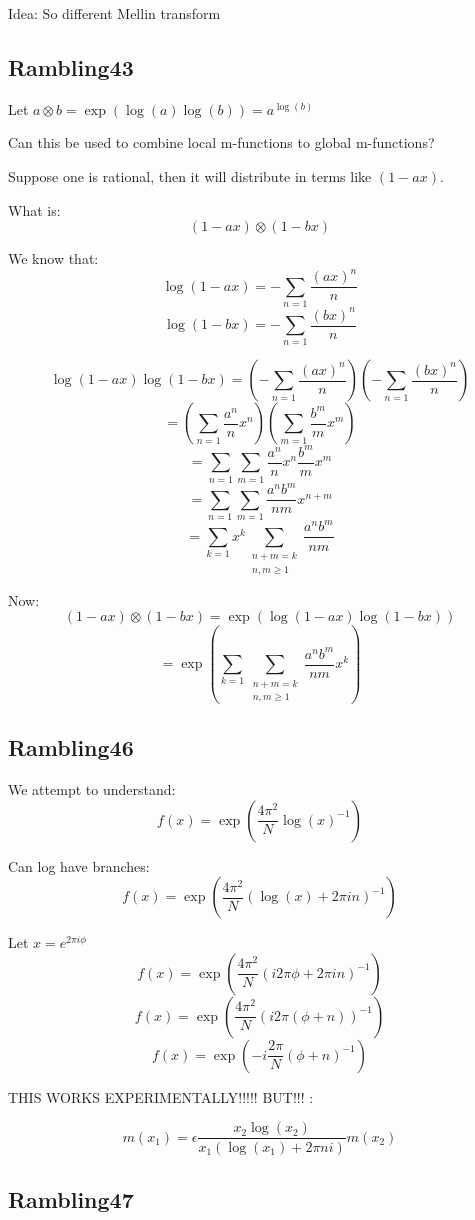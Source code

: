 \documentclass[a4paper]{amsart}
\begin{document}
Idea: So different Mellin transform


\subsection{Rambling43}


Let $a \otimes b = \exp(\log(a)\log(b)) = a^{\log(b)}$

Can this be used to combine local m-functions to global m-functions?

Suppose one is rational, then it will distribute in terms like $(1 - ax)$.

What is: 
$$(1 - ax) \otimes (1 - bx)$$

We know that:
$$\log(1 - ax) = - \sum_{n = 1} \frac{(ax)^n}{n}$$
$$\log(1 - bx) = - \sum_{n = 1} \frac{(bx)^n}{n}$$

$$\log(1 - ax)\log(1 - bx) = (- \sum_{n = 1} \frac{(ax)^n}{n})(- \sum_{n = 1} \frac{(bx)^n}{n})$$
$$ = (\sum_{n = 1} \frac{a^n}{n}x^n)(\sum_{m = 1} \frac{b^m}{m}x^m)$$
$$ = \sum_{n = 1} \sum_{m = 1} \frac{a^n}{n}x^n \frac{b^m}{m}x^m$$
$$ = \sum_{n = 1} \sum_{m = 1} \frac{a^nb^m}{nm} x^{n + m}$$
$$ = \sum_{k = 1} x^k \sum_{\substack{n + m = k \\ n, m \ge 1}} \frac{a^nb^m}{nm}$$

Now:
$$(1 - ax) \otimes (1 - bx) = \exp(\log(1 - ax)\log(1 - bx))$$
$$ = \exp(\sum_{k = 1} \sum_{\substack{n + m = k \\ n, m \ge 1}} \frac{a^nb^m}{nm} x^k)$$


\subsection{Rambling46}

We attempt to understand:
$$f(x) = \exp(\frac{4\pi^2}{N}\log(x)^{-1})$$

Can log have branches:
$$f(x) = \exp(\frac{4\pi^2}{N}(\log(x) + 2\pi in)^{-1})$$

Let $x = e^{2\pi i \phi}$
$$f(x) = \exp(\frac{4\pi^2}{N}(i 2 \pi \phi + 2\pi in)^{-1})$$
$$f(x) = \exp(\frac{4\pi^2}{N}(i 2 \pi (\phi + n))^{-1})$$
$$f(x) = \exp(-i\frac{2\pi}{N}(\phi + n)^{-1})$$

THIS WORKS EXPERIMENTALLY!!!!! BUT!!! :

$$m(x_1) = \epsilon\frac{x_2\log(x_2)}{x_1(\log(x_1) + 2\pi n i)}m(x_2)$$


\subsection{Rambling47}
\end{document}
